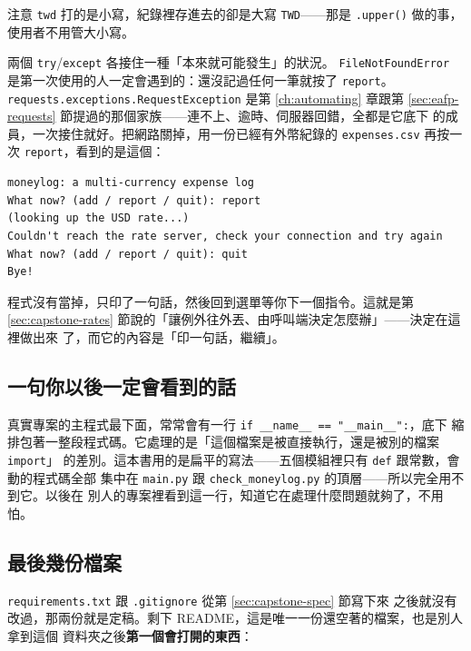注意 \texttt{twd} 打的是小寫，紀錄裡存進去的卻是大寫 \texttt{TWD}——那是
\texttt{.upper()} 做的事，使用者不用管大小寫。

兩個 \texttt{try}/\texttt{except} 各接住一種「本來就可能發生」的狀況。
\texttt{FileNotFoundError} 是第一次使用的人一定會遇到的：還沒記過任何一筆就按了
\texttt{report}。\texttt{requests.exceptions.RequestException} 是第 \ref{ch:automating}
章跟第 \ref{sec:eafp-requests} 節提過的那個家族——連不上、逾時、伺服器回錯，全都是它底下
的成員，一次接住就好。把網路關掉，用一份已經有外幣紀錄的 \texttt{expenses.csv} 再按一次
\texttt{report}，看到的是這個：

\begin{verbatim}
moneylog: a multi-currency expense log
What now? (add / report / quit): report
(looking up the USD rate...)
Couldn't reach the rate server, check your connection and try again
What now? (add / report / quit): quit
Bye!
\end{verbatim}

程式沒有當掉，只印了一句話，然後回到選單等你下一個指令。這就是第
\ref{sec:capstone-rates} 節說的「讓例外往外丟、由呼叫端決定怎麼辦」——決定在這裡做出來
了，而它的內容是「印一句話，繼續」。


\subsection*{一句你以後一定會看到的話}

真實專案的主程式最下面，常常會有一行 \texttt{if \_\_name\_\_ == "\_\_main\_\_":}，底下
縮排包著一整段程式碼。它處理的是「這個檔案是被直接執行，還是被別的檔案 \texttt{import}」
的差別。這本書用的是扁平的寫法——五個模組裡只有 \texttt{def} 跟常數，會動的程式碼全部
集中在 \texttt{main.py} 跟 \texttt{check\_moneylog.py} 的頂層——所以完全用不到它。以後在
別人的專案裡看到這一行，知道它在處理什麼問題就夠了，不用怕。

\subsection*{最後幾份檔案}

\texttt{requirements.txt} 跟 \texttt{.gitignore} 從第 \ref{sec:capstone-spec} 節寫下來
之後就沒有改過，那兩份就是定稿。剩下 README，這是唯一一份還空著的檔案，也是別人拿到這個
資料夾之後\textbf{第一個會打開的東西}：


